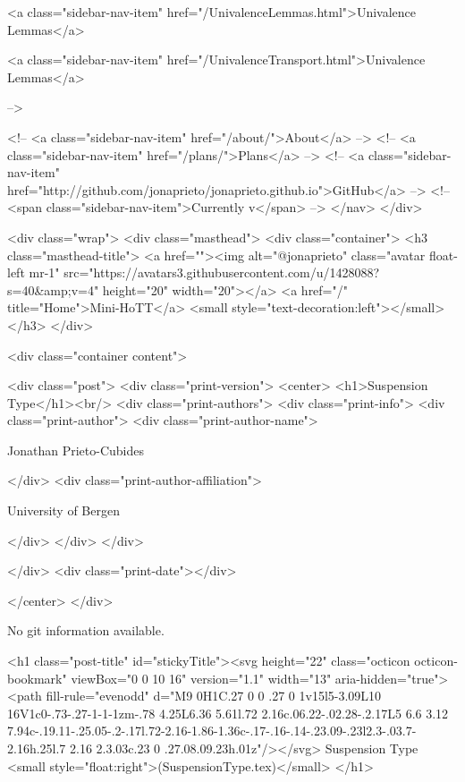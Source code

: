           <a class="sidebar-nav-item" href="/UnivalenceLemmas.html">Univalence Lemmas</a>
        
      
    
      
        
          <a class="sidebar-nav-item" href="/UnivalenceTransport.html">Univalence Lemmas</a>
        
      
     -->

    <!-- <a class="sidebar-nav-item" href="/about/">About</a> -->
    <!-- <a class="sidebar-nav-item" href="/plans/">Plans</a> -->
    <!-- <a class="sidebar-nav-item" href="http://github.com/jonaprieto/jonaprieto.github.io">GitHub</a> -->
    <!-- <span class="sidebar-nav-item">Currently v</span> -->
  </nav>
</div>

    <div class="wrap">
      <div class="masthead">
        <div class="container">
          <h3 class="masthead-title">
            <a href=""><img alt="@jonaprieto" class="avatar float-left mr-1" src="https://avatars3.githubusercontent.com/u/1428088?s=40&amp;v=4" height="20" width="20"></a>
            <a href="/" title="Home">Mini-HoTT</a>
            <small style="text-decoration:left"></small>
          </h3>
        </div>
      
      <div class="container content">
        







<div class="post">
  <div class="print-version">
    <center>
      <h1>Suspension Type</h1><br/>
        <div class="print-authors">
          <div class="print-info">
            <div class="print-author">
              <div class="print-author-name">
                
                  Jonathan Prieto-Cubides
                
              </div>
              <div class="print-author-affiliation">
                
                  University of Bergen
                
                </div>
            </div>
          </div>
          
          
        </div>
        <div class="print-date"></div>
        
        
    </center>
  </div>

  
  No git information available.
  

  <h1 class="post-title" id="stickyTitle"><svg height="22" class="octicon octicon-bookmark" viewBox="0 0 10 16" version="1.1" width="13" aria-hidden="true"><path fill-rule="evenodd" d="M9 0H1C.27 0 0 .27 0 1v15l5-3.09L10 16V1c0-.73-.27-1-1-1zm-.78 4.25L6.36 5.61l.72 2.16c.06.22-.02.28-.2.17L5 6.6 3.12 7.94c-.19.11-.25.05-.2-.17l.72-2.16-1.86-1.36c-.17-.16-.14-.23.09-.23l2.3-.03.7-2.16h.25l.7 2.16 2.3.03c.23 0 .27.08.09.23h.01z"/></svg> Suspension Type <small style="float:right">(SuspensionType.tex)</small>
  </h1>

